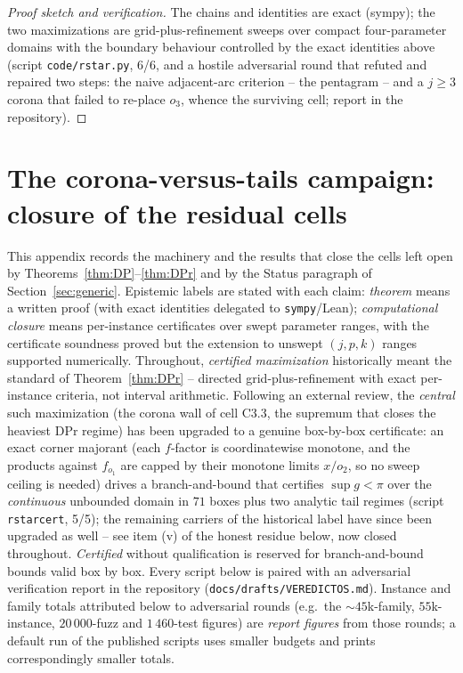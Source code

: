 \documentclass[11pt]{article}
\theoremstyle{definition}
\begin{document}
\begin{proof}[Proof sketch and verification]
The chains and identities are exact (sympy); the two maximizations are
grid-plus-refinement sweeps over compact four-parameter domains with
the boundary behaviour controlled by the exact identities above
(script \texttt{code/rstar.py}, 6/6, and a hostile adversarial round
that refuted and repaired two steps: the naive adjacent-arc criterion
-- the pentagram -- and a $j\ge3$ corona that failed to re-place
$o_3$, whence the surviving cell; report in the repository).
\end{proof}

\section{The corona-versus-tails campaign: closure of the residual cells}
\label{app:campaign}

This appendix records the machinery and the results that close the
cells left open by Theorems~\ref{thm:DP}--\ref{thm:DPr} and by the
Status paragraph of Section~\ref{sec:generic}. Epistemic labels are
stated with each claim: \emph{theorem} means a written proof (with
exact identities delegated to \texttt{sympy}/Lean);
\emph{computational closure} means per-instance certificates over
swept parameter ranges, with the certificate soundness proved but the
extension to unswept $(j,p,k)$ ranges supported numerically.
Throughout, \emph{certified maximization} historically meant the
standard of Theorem~\ref{thm:DPr} -- directed grid-plus-refinement
with exact per-instance criteria, not interval arithmetic. Following
an external review, the \emph{central} such maximization (the corona
wall of cell C3.3, the supremum that closes the heaviest DPr regime)
has been upgraded to a genuine box-by-box certificate: an exact
corner majorant (each $f$-factor is coordinatewise monotone, and the
products against $f_{o_1}$ are capped by their monotone limits
$x/o_2$, so no sweep ceiling is needed) drives a branch-and-bound
that certifies $\sup g<\pi$ over the \emph{continuous} unbounded
domain in $71$ boxes plus two analytic tail regimes (script
\texttt{rstarcert}, 5/5); the remaining carriers of the historical
label have since been upgraded as well -- see item (v) of the
honest residue below, now closed throughout. \emph{Certified}
without qualification is
reserved for branch-and-bound bounds valid box by box. Every
script below is paired with an adversarial verification report in the
repository (\texttt{docs/drafts/VEREDICTOS.md}). Instance and family
totals attributed below to adversarial rounds (e.g.\ the
${\sim}45$k-family, $55$k-instance, $20\,000$-fuzz and
$1\,460$-test figures) are \emph{report figures} from those rounds;
a default run of the published scripts uses smaller budgets and
prints correspondingly smaller totals.
\end{document}
